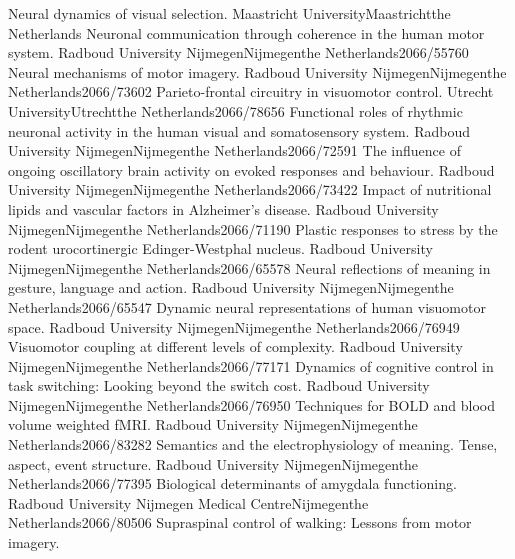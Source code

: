 	{Neural dynamics of visual selection.}
	{Maastricht University}{Maastricht}{the Netherlands}{}
	{Neuronal communication through coherence in the human motor system.}
	{Radboud University Nijmegen}{Nijmegen}{the Netherlands}{2066/55760}
	{Neural mechanisms of motor imagery.}
	{Radboud University Nijmegen}{Nijmegen}{the Netherlands}{2066/73602}
	{Parieto-frontal circuitry in visuomotor control.}
	{Utrecht University}{Utrecht}{the Netherlands}{2066/78656}
	{Functional roles of rhythmic neuronal activity in the human visual and somatosensory system.}
	{Radboud University Nijmegen}{Nijmegen}{the Netherlands}{2066/72591}
	{The influence of ongoing oscillatory brain activity on evoked responses and behaviour.}
	{Radboud University Nijmegen}{Nijmegen}{the Netherlands}{2066/73422}
	{Impact of nutritional lipids and vascular factors in Alzheimer's disease.}
	{Radboud University Nijmegen}{Nijmegen}{the Netherlands}{2066/71190}
	{Plastic responses to stress by the rodent urocortinergic Edinger-Westphal nucleus.}
	{Radboud University Nijmegen}{Nijmegen}{the Netherlands}{2066/65578}
	{Neural reflections of meaning in gesture, language and action.}
	{Radboud University Nijmegen}{Nijmegen}{the Netherlands}{2066/65547}
	{Dynamic neural representations of human visuomotor space.}
	{Radboud University Nijmegen}{Nijmegen}{the Netherlands}{2066/76949}
	{Visuomotor coupling at different levels of complexity.}
	{Radboud University Nijmegen}{Nijmegen}{the Netherlands}{2066/77171}
	{Dynamics of cognitive control in task switching: Looking beyond the switch cost.}
	{Radboud University Nijmegen}{Nijmegen}{the Netherlands}{2066/76950}
	{Techniques for BOLD and blood volume weighted fMRI.}
	{Radboud University Nijmegen}{Nijmegen}{the Netherlands}{2066/83282}
	{Semantics and the electrophysiology of meaning. Tense, aspect, event structure.}
	{Radboud University Nijmegen}{Nijmegen}{the Netherlands}{2066/77395}
	{Biological determinants of amygdala functioning.}
	{Radboud University Nijmegen Medical Centre}{Nijmegen}{the Netherlands}{2066/80506}
	{Supraspinal control of walking: Lessons from motor imagery.}
